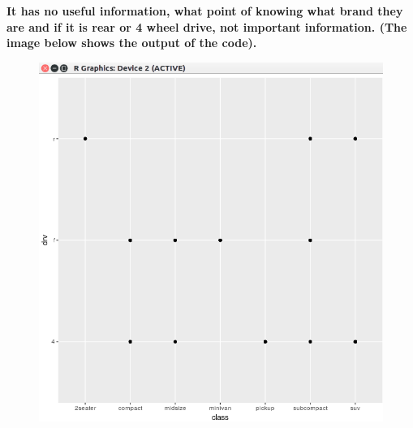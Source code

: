 \documentclass[11pt]{article}
\begin{document}
\begin{enumerate}
\textbf{It has no useful information, what point of knowing what brand they are and if it is rear or 4 wheel drive, not important information. (The image below shows the output of the code). }

\begin{figure}[ht]
\includegraphics[scale = .25]{drv.png}
\centering
\end{figure}
\end{enumerate}


\newpage
\end{document}
